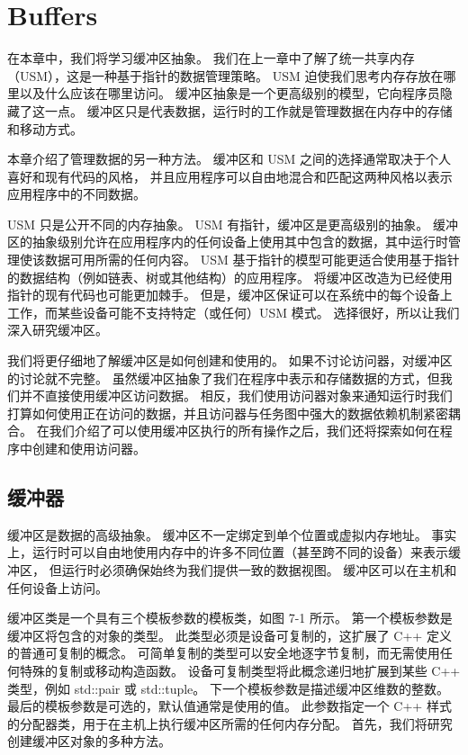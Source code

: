 \section{Buffers}
在本章中，我们将学习缓冲区抽象。 我们在上一章中了解了统一共享内存（USM），这是一种基于指针的数据管理策略。 
USM 迫使我们思考内存存放在哪里以及什么应该在哪里访问。 缓冲区抽象是一个更高级别的模型，它向程序员隐藏了这一点。 
缓冲区只是代表数据，运行时的工作就是管理数据在内存中的存储和移动方式。

本章介绍了管理数据的另一种方法。 缓冲区和 USM 之间的选择通常取决于个人喜好和现有代码的风格，
并且应用程序可以自由地混合和匹配这两种风格以表示应用程序中的不同数据。

USM 只是公开不同的内存抽象。 USM 有指针，缓冲区是更高级别的抽象。 
缓冲区的抽象级别允许在应用程序内的任何设备上使用其中包含的数据，其中运行时管理使该数据可用所需的任何内容。 
USM 基于指针的模型可能更适合使用基于指针的数据结构（例如链表、树或其他结构）的应用程序。 
将缓冲区改造为已经使用指针的现有代码也可能更加棘手。 
但是，缓冲区保证可以在系统中的每个设备上工作，而某些设备可能不支持特定（或任何）USM 模式。 
选择很好，所以让我们深入研究缓冲区。

我们将更仔细地了解缓冲区是如何创建和使用的。 如果不讨论访问器，对缓冲区的讨论就不完整。 
虽然缓冲区抽象了我们在程序中表示和存储数据的方式，但我们并不直接使用缓冲区访问数据。 
相反，我们使用访问器对象来通知运行时我们打算如何使用正在访问的数据，并且访问器与任务图中强大的数据依赖机制紧密耦合。 
在我们介绍了可以使用缓冲区执行的所有操作之后，我们还将探索如何在程序中创建和使用访问器。


\subsection{缓冲器}
缓冲区是数据的高级抽象。 缓冲区不一定绑定到单个位置或虚拟内存地址。 
事实上，运行时可以自由地使用内存中的许多不同位置（甚至跨不同的设备）来表示缓冲区，
但运行时必须确保始终为我们提供一致的数据视图。 缓冲区可以在主机和任何设备上访问。

缓冲区类是一个具有三个模板参数的模板类，如图 7-1 所示。 第一个模板参数是缓冲区将包含的对象的类型。 
此类型必须是设备可复制的，这扩展了 C++ 定义的普通可复制的概念。 
可简单复制的类型可以安全地逐字节复制，而无需使用任何特殊的复制或移动构造函数。 
设备可复制类型将此概念递归地扩展到某些 C++ 类型，例如 std::pair 或 std::tuple。 
下一个模板参数是描述缓冲区维数的整数。 最后的模板参数是可选的，默认值通常是使用的值。 
此参数指定一个 C++ 样式的分配器类，用于在主机上执行缓冲区所需的任何内存分配。 
首先，我们将研究创建缓冲区对象的多种方法。

